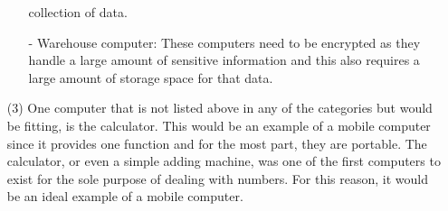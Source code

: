 \documentclass[12pt]{article}
\begin{document}
\begin{enumerate}
\begin{itemize}[leftmargin=*]
                    collection  of data.
                \item[-] Warehouse computer: These computers need to be
                    encrypted as they handle a large amount of sensitive
                    information and this also requires a large amount of storage
                    space for that data.
            \end{itemize}
        \item[(3)]
            One computer that is not listed above in any of the categories but
            would be fitting, is the calculator. This would be an example of a
            mobile computer since it provides one function and for the most
            part, they are portable. The calculator, or even a simple adding
            machine, was one of the first computers to exist for the sole
            purpose of dealing with numbers. For this reason, it would be an
            ideal example of a mobile computer.
    \end{enumerate}
\end{document}
